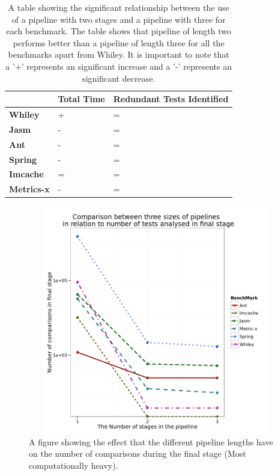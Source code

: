 \documentclass[11pt
              , a4paper
              , twoside
              , openright
              ]{report}
\begin{document}
\begin{table}[h]
\centering
\begin{tabular}{|l|l|l|}
\hline
{\bf }          & {\bf Total Time} & {\bf Redundant Tests Identified} \\ \hline
{\bf Whiley}    & +                & =                           \\ \hline
{\bf Jasm}      & -                & =                           \\ \hline
{\bf Ant}       & -                & =                           \\ \hline
{\bf Spring}    & -                & =                           \\ \hline
{\bf Imcache}   & =                & =                           \\ \hline
{\bf Metrics-x} & -                & =                           \\ \hline
\end{tabular}
\caption{A table showing the significant relationship between the use of a pipeline with two stages and a pipeline with three for each benchmark. The table shows that pipeline of length two performs better than a pipeline of length three for all the benchmarks apart from Whiley. It is important to note that a '+' represents an significant increase and a '-' represents an significant decrease.}
\label{pipelinesig}
\end{table}

\begin{figure}[h]
\begin{center}
\includegraphics[height=10cm, width = 14.5cm]{Pipeline.png}
\end{center}
\caption{A figure showing the effect that the different pipeline lengths have on the number of comparisons during the final stage (Most computationally heavy). }
\label{fig:pipelinegraph}
\end{figure}
\end{document}
